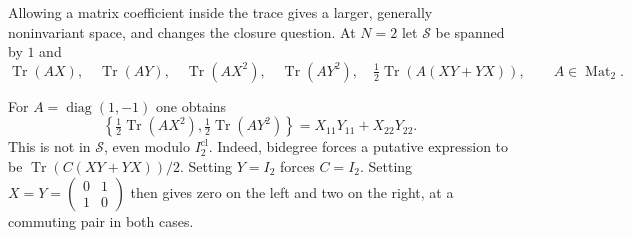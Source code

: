 Allowing a matrix coefficient inside the trace gives a larger,
generally noninvariant space, and changes the closure question.
At $N=2$ let $\mathcal S$ be spanned by $1$ and
\[
 \operatorname{Tr}(AX),\quad\operatorname{Tr}(AY),\quad
 \operatorname{Tr}(AX^2),\quad\operatorname{Tr}(AY^2),\quad
 \tfrac12\operatorname{Tr}(A(XY+YX)),
 \qquad A\in\operatorname{Mat}_2.
\]

For $A=\operatorname{diag}(1,-1)$ one obtains
\[
 \left\{\tfrac12\operatorname{Tr}(AX^2),
             \tfrac12\operatorname{Tr}(AY^2)\right\}
       =X_{11}Y_{11}+X_{22}Y_{22}.
\]
This is not in $\mathcal S$, even modulo $I_2^{\mathrm{cl}}$.
Indeed, bidegree forces a putative expression to be
$\operatorname{Tr}(C(XY+YX))/2$. Setting $Y=I_2$ forces
$C=I_2$. Setting $X=Y=\left(\begin{smallmatrix}0&1\\1&0\end{smallmatrix}\right)$
then gives zero on the left and two on the right, at a commuting
pair in both cases.

